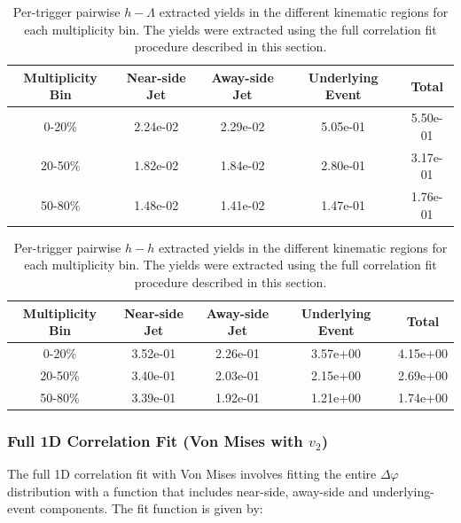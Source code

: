 \documentclass[ALICE,manyauthors]{ALICE_analysis_notes}
\begin{document}
\begin{table}[h!]
\centering
\begin{tabular}{| c | c | c | c | c | }
\hline
Multiplicity Bin & Near-side Jet & Away-side Jet & Underlying Event & Total  \\
\hline
	
0-20\% & 2.24e-02  & 2.29e-02  & 5.05e-01 & 5.50e-01 \\
20-50\% & 1.82e-02 & 1.84e-02  & 2.80e-01 & 3.17e-01 \\
50-80\% & 1.48e-02 & 1.41e-02  & 1.47e-01 & 1.76e-01 \\
	
\hline
\end{tabular}
\caption{Per-trigger pairwise $h-\Lambda$ extracted yields in the different kinematic regions for each multiplicity bin. The yields were extracted using the full correlation fit procedure described in this section.}
\label{h_lambda_yield_table_fullfit}
\end{table}
	
\begin{table}[h!]
\centering
\begin{tabular}{| c | c | c | c | c | }
\hline
Multiplicity Bin & Near-side Jet & Away-side Jet & Underlying Event & Total  \\
\hline

0-20\% & 3.52e-01  & 2.26e-01  & 3.57e+00 & 4.15e+00 \\
20-50\% & 3.40e-01 & 2.03e-01  & 2.15e+00 & 2.69e+00 \\
50-80\% & 3.39e-01 & 1.92e-01  & 1.21e+00 & 1.74e+00 \\

\hline
\end{tabular}
\caption{Per-trigger pairwise $h-h$ extracted yields in the different kinematic regions for each multiplicity bin. The yields were extracted using the full correlation fit procedure described in this section.}
\label{h_h_yield_table_fullfit}
\end{table}


\subsubsection{Full 1D Correlation Fit (Von Mises with $v_{2}$)}
\label{full_correlation_fit_von}
The full 1D correlation fit with  Von Mises involves fitting the entire $\Delta\varphi$ distribution with a function that includes near-side, away-side and underlying-event components. The fit function is given by:
\end{document}
